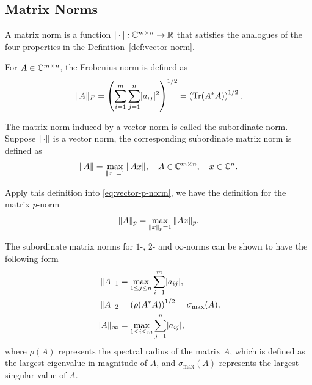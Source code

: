 \documentclass[12pt]{article}
\begin{document}
\subsection{Matrix Norms} \label{subsec:matrix-norms}
\begin{definition}
    A matrix norm is a function $\|{\cdot}\|:\mathbb{C}^{m\times n} \to \mathbb{R}$ that satisfies the analogues of the four properties in the Definition~\ref{def:vector-norm}.
\end{definition}

\begin{example}
    For $A\in\mathbb{C}^{m\times n}$, the Frobenius norm is defined as
    \begin{equation}
        \notag
        \|{A}\|_F = \left(\sum_{i = 1}^m \sum_{j = 1}^n \lvert a_{ij}\rvert^2\right)^{1/2} = \left(\mathrm{Tr}(A^* A)\right)^{1/2}.
    \end{equation}
\end{example}

\begin{example}
    The matrix norm induced by a vector norm is called the subordinate norm. Suppose $\|{\cdot}\|$ is a vector norm, the corresponding subordinate matrix norm is defined as 
    \begin{equation}
        \notag 
        \|{A}\| = \max_{\|{x}\| = 1} \|{Ax}\|, \quad A \in \mathbb{C}^{m\times n}, \quad x \in \mathbb{C}^n.
    \end{equation}

    Apply this definition into \eqref{eq:vector-p-norm}, we have the definition for the matrix $p$-norm 
    \begin{equation}
        \notag 
        \|{A}\|_p = \max_{\|{x}\|_p = 1} \|{Ax}\|_{p}.
    \end{equation}

    The subordinate matrix norms for $1$-, $2$- and $\infty$-norms can be shown to have the following form 
    \begin{equation}
        \notag 
        \begin{aligned}
            \|{A}\|_1 &= \max_{1\leq j \leq n} \sum_{i = 1}^m \lvert a_{ij}\rvert, \\
            \|{A}\|_2 &= \left(\rho(A^* A)\right)^{1/2} = \sigma_{\max}(A),\\
            \|{A}\|_\infty & = \max_{1 \leq i \leq m} \sum_{j = 1}^n \lvert a_{ij}\rvert,
        \end{aligned}
    \end{equation}
    where $\rho(A)$ represents the spectral radius of the matrix $A$, which is defined as the largest eigenvalue in magnitude of $A$, and $\sigma_{\max}(A)$ represents the largest singular value of $A$.
\end{example}
\end{document}
